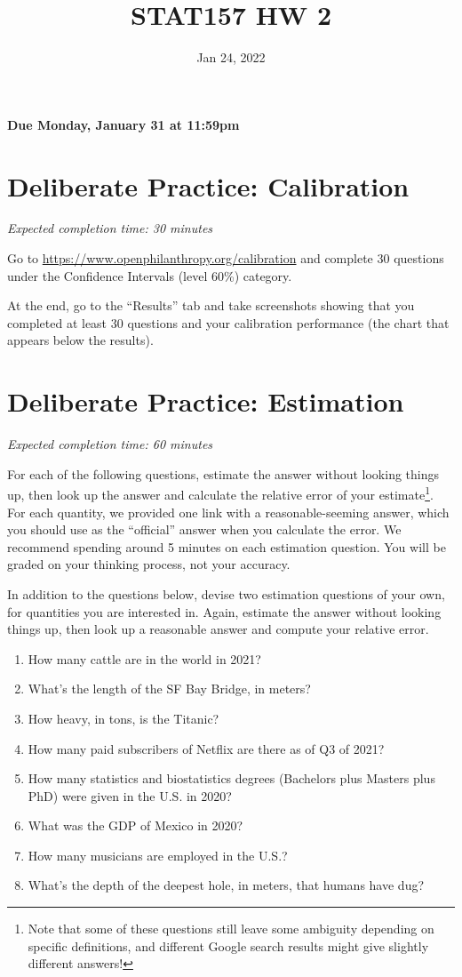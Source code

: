 \documentclass[11pt]{article}
\title{STAT157 HW 2}
\date{Jan 24, 2022}
\begin{document}
\maketitle

\hfill \textbf{Due Monday, January 31 at 11:59pm}

\section*{Deliberate Practice: Calibration}

\emph{Expected completion time: 30 minutes}

Go to \url{https://www.openphilanthropy.org/calibration} and complete 30 questions under the Confidence Intervals (level 60\%) category.

At the end, go to the ``Results'' tab and take screenshots showing that 
you completed at least 30 questions and your calibration 
performance (the chart that appears below the results).

\section*{Deliberate Practice: Estimation}

\emph{Expected completion time: 60 minutes}


For each of the following questions, estimate the answer without looking things up, then look up the answer and calculate the relative error of your estimate\footnote{Note that some of these questions still leave some ambiguity depending on specific definitions, and different Google search results might give slightly different answers!}. For each quantity, we provided one link with a reasonable-seeming answer, which you should use as the ``official'' answer when you calculate the error. We recommend spending around 5 minutes on each estimation question. You will be graded on your thinking process, not your accuracy.

In addition to the questions below, devise two estimation questions of your own, for quantities you are interested in. Again, estimate the answer without looking things up, then look up a reasonable answer and compute your relative error.

\begin{enumerate}
	\item How many cattle are in the world in 2021? 
	\item What's the length of the SF Bay Bridge, in meters? 
	\item How heavy, in tons, is the Titanic? 
	\item How many paid subscribers of Netflix are there as of Q3 of 2021?
	\item How many statistics and biostatistics degrees (Bachelors plus Masters plus PhD) were given in the U.S. in 2020? 
	\item What was the GDP of Mexico in 2020? 
	\item How many musicians are employed in the U.S.?
	\item What's the depth of the deepest hole, in meters, that humans have dug? 
\end{enumerate}
\end{document}
